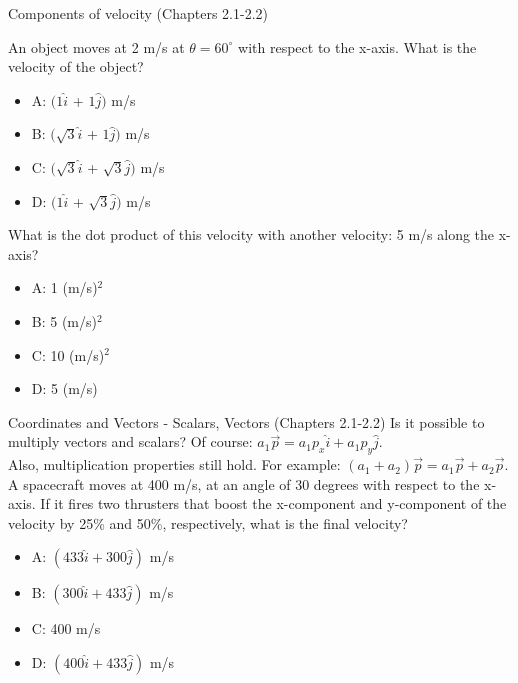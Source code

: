 \documentclass{beamer}
\begin{document}
\begin{frame}{Components of velocity (Chapters 2.1-2.2)}
\small
\begin{minipage}[b]{0.45\linewidth}
An object moves at 2 m/s at $\theta = 60^{\circ}$ with respect to the x-axis.  What is the velocity of the object?
\vspace{0.2cm}
\begin{itemize}
\item A: $(1\hat{i}$ + $1\hat{j})$  m/s
\item B: $(\sqrt{3}\hat{i}$ + $1\hat{j})$  m/s
\item C: $(\sqrt{3}\hat{i}$ + $\sqrt{3}\hat{j})$  m/s
\item D: $(1\hat{i}$ + $\sqrt{3}\hat{j})$  m/s
\end{itemize}
\end{minipage}
\hspace{0.5cm}
\begin{minipage}[b]{0.45\linewidth}
What is the dot product of this velocity with another velocity: 5 m/s along the x-axis?
\vspace{0.7cm}
\begin{itemize}
\item A: 1 (m/s)$^2$
\item B: 5 (m/s)$^2$
\item C: 10 (m/s)$^2$
\item D: 5 (m/s)
\end{itemize}
\end{minipage}
\end{frame}

\begin{frame}{Coordinates and Vectors - Scalars, Vectors (Chapters 2.1-2.2)}
Is it possible to multiply vectors and scalars?  Of course: $a_1\vec{p} = a_1p_x\hat{i}+a_1p_y\hat{j}$.\\
\vspace{0.2cm}
Also, multiplication properties still hold.  For example: $(a_1+a_2)\vec{p} = a_1\vec{p}+a_2\vec{p}$. \\
\vspace{0.2cm}
\small
A spacecraft moves at 400 m/s, at an angle of 30 degrees with respect to the x-axis.  If it fires two thrusters that boost the x-component and y-component of the velocity by 25\% and 50\%, respectively, what is the final velocity?
\begin{itemize}
\item A: $(433\hat{i}+300\hat{j})$ m/s
\item B: $(300\hat{i}+433\hat{j})$ m/s
\item C: 400 m/s
\item D: $(400\hat{i}+433\hat{j})$ m/s
\end{itemize}
\end{frame}
\end{document}
